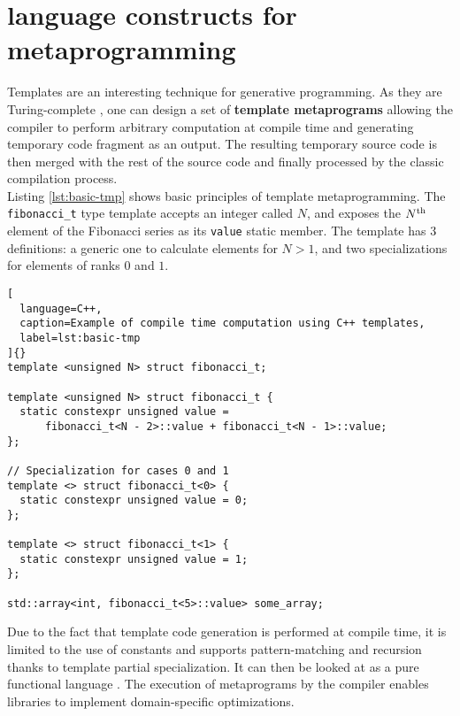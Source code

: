 \documentclass[../main]{subfiles}
\begin{document}
\section{
  \cpp language constructs for metaprogramming
}

Templates are an interesting technique for generative programming. As they
are Turing-complete \cite{unruh:1994}, one can design a set of
\textbf{template metaprograms} \cite{abrahams:2004} allowing the compiler
to perform arbitrary computation at compile time and generating temporary
\cpp code fragment as an output.
The resulting temporary source code is then
merged with the rest of the source code and finally processed by the classic
compilation process.
\\

Listing \ref{lst:basic-tmp} shows basic principles of \cpp template
metaprogramming. The \lstinline{fibonacci_t} type template accepts an
integer called $N$, and exposes the $N\textsuperscript{th}$ element
of the Fibonacci series as its \lstinline{value} static member.
The template has 3 definitions:
a generic one to calculate elements for $N > 1$,
and two specializations for elements of ranks $0$ and $1$.

\clearpage

\begin{lstlisting}[
  language=C++,
  caption=Example of compile time computation using C++ templates,
  label=lst:basic-tmp
]{}
template <unsigned N> struct fibonacci_t;

template <unsigned N> struct fibonacci_t {
  static constexpr unsigned value =
      fibonacci_t<N - 2>::value + fibonacci_t<N - 1>::value;
};

// Specialization for cases 0 and 1
template <> struct fibonacci_t<0> {
  static constexpr unsigned value = 0;
};

template <> struct fibonacci_t<1> {
  static constexpr unsigned value = 1;
};

std::array<int, fibonacci_t<5>::value> some_array;
\end{lstlisting}

Due to the fact that template code generation is performed at compile time,
it is limited to the use of constants and supports pattern-matching and
recursion thanks to template partial specialization. It can then be looked
at as a pure functional language \cite{haeri:2012}.
The execution of metaprograms by the compiler enables libraries to implement
domain-specific optimizations.
\\
\end{document}
